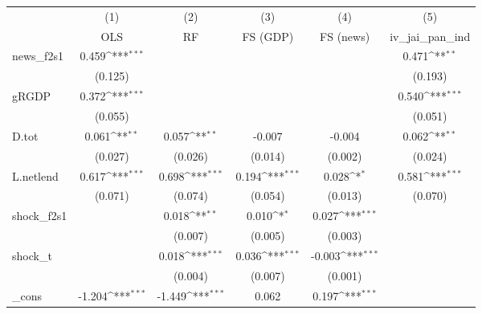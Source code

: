 {
\def\sym#1{\ifmmode^{#1}\else\(^{#1}\)\fi}
\begin{tabular}{l*{5}{c}}
\toprule
            &\multicolumn{1}{c}{(1)}&\multicolumn{1}{c}{(2)}&\multicolumn{1}{c}{(3)}&\multicolumn{1}{c}{(4)}&\multicolumn{1}{c}{(5)}\\
            &\multicolumn{1}{c}{OLS}&\multicolumn{1}{c}{RF}&\multicolumn{1}{c}{FS (GDP)}&\multicolumn{1}{c}{FS (news)}&\multicolumn{1}{c}{iv\_jai\_pan\_ind}\\
\midrule
news\_f2s1   &       0.459\sym{***}&                     &                     &                     &       0.471\sym{**} \\
            &     (0.125)         &                     &                     &                     &     (0.193)         \\
\addlinespace
gRGDP       &       0.372\sym{***}&                     &                     &                     &       0.540\sym{***}\\
            &     (0.055)         &                     &                     &                     &     (0.051)         \\
\addlinespace
D.tot       &       0.061\sym{**} &       0.057\sym{**} &      -0.007         &      -0.004         &       0.062\sym{**} \\
            &     (0.027)         &     (0.026)         &     (0.014)         &     (0.002)         &     (0.024)         \\
\addlinespace
L.netlend   &       0.617\sym{***}&       0.698\sym{***}&       0.194\sym{***}&       0.028\sym{*}  &       0.581\sym{***}\\
            &     (0.071)         &     (0.074)         &     (0.054)         &     (0.013)         &     (0.070)         \\
\addlinespace
shock\_f2s1  &                     &       0.018\sym{**} &       0.010\sym{*}  &       0.027\sym{***}&                     \\
            &                     &     (0.007)         &     (0.005)         &     (0.003)         &                     \\
\addlinespace
shock\_t     &                     &       0.018\sym{***}&       0.036\sym{***}&      -0.003\sym{***}&                     \\
            &                     &     (0.004)         &     (0.007)         &     (0.001)         &                     \\
\addlinespace
\_cons      &      -1.204\sym{***}&      -1.449\sym{***}&       0.062         &       0.197\sym{***}&                     \\

\end{tabular}}
